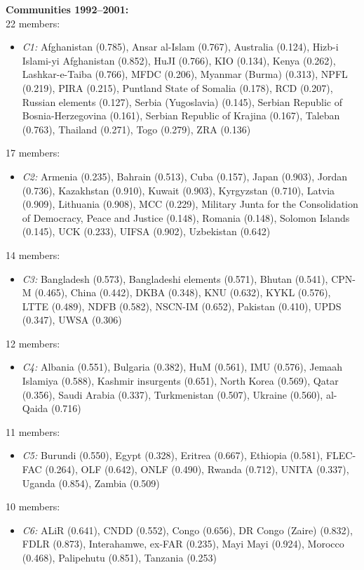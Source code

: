 \textbf{Communities 1992--2001:}\\
22 members:
\begin{itemize}[noitemsep, topsep=0pt]
    \item \textit{C1:} Afghanistan (0.785), Ansar al-Islam (0.767), Australia (0.124), Hizb-i Islami-yi Afghanistan (0.852), HuJI (0.766), KIO (0.134), Kenya (0.262), Lashkar-e-Taiba (0.766), MFDC (0.206), Myanmar (Burma) (0.313), NPFL (0.219), PIRA (0.215), Puntland State of Somalia (0.178), RCD (0.207), Russian elements (0.127), Serbia (Yugoslavia) (0.145), Serbian Republic of Bosnia-Herzegovina (0.161), Serbian Republic of Krajina (0.167), Taleban (0.763), Thailand (0.271), Togo (0.279), ZRA (0.136)
\end{itemize}
17 members:
\begin{itemize}[noitemsep, topsep=0pt]
    \item \textit{C2:} Armenia (0.235), Bahrain (0.513), Cuba (0.157), Japan (0.903), Jordan (0.736), Kazakhstan (0.910), Kuwait (0.903), Kyrgyzstan (0.710), Latvia (0.909), Lithuania (0.908), MCC (0.229), Military Junta for the Consolidation of Democracy, Peace and Justice (0.148), Romania (0.148), Solomon Islands (0.145), UCK (0.233), UIFSA (0.902), Uzbekistan (0.642)
\end{itemize}
14 members:
\begin{itemize}[noitemsep, topsep=0pt]
    \item \textit{C3:} Bangladesh (0.573), Bangladeshi elements (0.571), Bhutan (0.541), CPN-M (0.465), China (0.442), DKBA (0.348), KNU (0.632), KYKL (0.576), LTTE (0.489), NDFB (0.582), NSCN-IM (0.652), Pakistan (0.410), UPDS (0.347), UWSA (0.306)
\end{itemize}
12 members:
\begin{itemize}[noitemsep, topsep=0pt]
    \item \textit{C4:} Albania (0.551), Bulgaria (0.382), HuM (0.561), IMU (0.576), Jemaah Islamiya (0.588), Kashmir insurgents (0.651), North Korea (0.569), Qatar (0.356), Saudi Arabia (0.337), Turkmenistan (0.507), Ukraine (0.560), al-Qaida (0.716)
\end{itemize}
11 members:
\begin{itemize}[noitemsep, topsep=0pt]
    \item \textit{C5:} Burundi (0.550), Egypt (0.328), Eritrea (0.667), Ethiopia (0.581), FLEC-FAC (0.264), OLF (0.642), ONLF (0.490), Rwanda (0.712), UNITA (0.337), Uganda (0.854), Zambia (0.509)
\end{itemize}
10 members:
\begin{itemize}[noitemsep, topsep=0pt]
    \item \textit{C6:} ALiR (0.641), CNDD (0.552), Congo (0.656), DR Congo (Zaire) (0.832), FDLR (0.873), Interahamwe, ex-FAR (0.235), Mayi Mayi (0.924), Morocco (0.468), Palipehutu (0.851), Tanzania (0.253)
\end{itemize}
